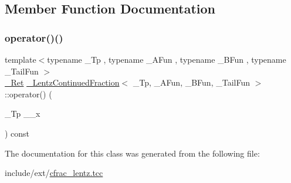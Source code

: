 \subsection{Member Function Documentation}
\mbox{\label{class__LentzContinuedFraction_a7b7d840c3192d56daf9b8b273f6166db}} 
\subsubsection{\texorpdfstring{operator()()}{operator()()}}
{\footnotesize\ttfamily template$<$typename \+\_\+\+Tp , typename \+\_\+\+A\+Fun , typename \+\_\+\+B\+Fun , typename \+\_\+\+Tail\+Fun $>$ \\
\hyperlink{class__LentzContinuedFraction_ae549d8853f57a08201bea3a926d30992}{\+\_\+\+Ret} \hyperlink{class__LentzContinuedFraction}{\+\_\+\+Lentz\+Continued\+Fraction}$<$ \+\_\+\+Tp, \+\_\+\+A\+Fun, \+\_\+\+B\+Fun, \+\_\+\+Tail\+Fun $>$\+::operator() (\begin{DoxyParamCaption}\item[{\+\_\+\+Tp}]{\+\_\+\+\_\+x }\end{DoxyParamCaption}) const\hspace{0.3cm}{\ttfamily [inline]}}



The documentation for this class was generated from the following file\+:\begin{DoxyCompactItemize}
\item 
include/ext/\hyperlink{cfrac__lentz_8tcc}{cfrac\+\_\+lentz.\+tcc}\end{DoxyCompactItemize}
